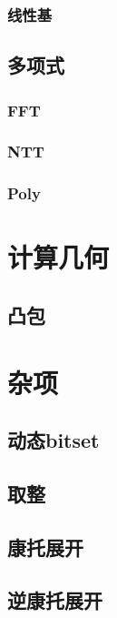 \subsubsection{线性基}

\subsection{多项式}
\subsubsection{FFT}


\subsubsection{NTT}

\subsubsection{Poly}

\section{计算几何}
\subsection{凸包}


\section{杂项}
\subsection{动态bitset}

\subsection{取整}

\subsection{康托展开}


\subsection{逆康托展开}


